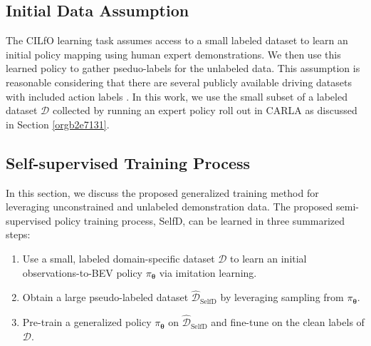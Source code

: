 \documentclass[12pt, letterpaper,cleardoubleempty,BCOR1cm]{scrbook}
\begin{document}
\subsection{Initial Data Assumption}
\label{sec:org04ec2f7}
The CILfO learning task assumes access to a small labeled dataset to learn an
initial policy mapping using human expert demonstrations. We then use this
learned policy to gather pseduo-labels for the unlabeled data. This assumption
is reasonable considering that there are several publicly available driving
datasets with included action labels \cite{Geiger2012AreWR,Argoverse2}. In this
work, we use the small subset of a labeled dataset \(\mathcal{D}\) collected by running
an expert policy roll out in CARLA \cite{Dosovitskiy2017} as discussed in
Section \ref{orgb2e7131}.

\subsection{Self-supervised Training Process}
\label{sec:orge5d1772}
In this section, we discuss the proposed generalized training method for
leveraging unconstrained and unlabeled demonstration data. The proposed
semi-supervised policy training process, SelfD, can be learned in three
summarized steps:
\begin{enumerate}
\item Use a small, labeled domain-specific dataset \(\mathcal{D}\) to learn an initial
observations-to-BEV policy \(\pi_{\boldsymbol{\theta}}\) via imitation learning.
\item Obtain a large pseudo-labeled dataset \(\hat{\mathcal{D}}_{\text{SelfD}}\) by
leveraging sampling from \(\pi_{\boldsymbol{\theta}}\).
\item Pre-train a generalized policy \(\pi_{\boldsymbol{\theta}}\) on
\(\hat{\mathcal{D}}_{\text{SelfD}}\) and fine-tune on the clean labels of \(\mathcal{D}\).
\end{enumerate}
\end{document}
